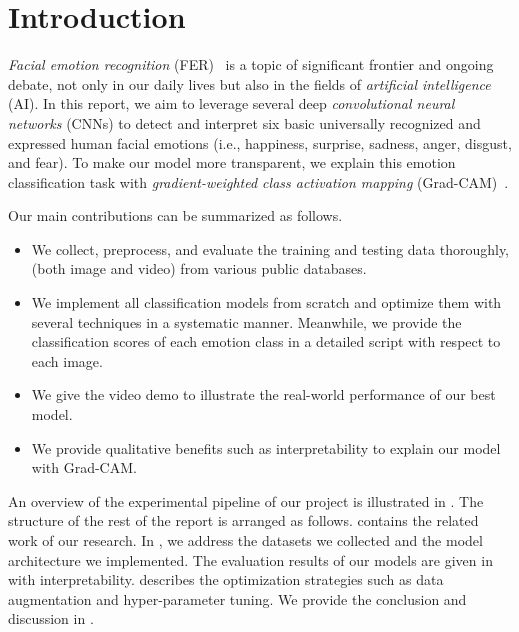 \section{Introduction}
\label{sec:intro}

\textit{Facial emotion recognition} (FER)~\cite{Ko18,JainSS19,YinTLS019,Malik0R21} is a topic of significant frontier and ongoing debate, 
not only in our daily lives but also in the fields of \textit{artificial intelligence} (AI).
In this report, we aim to leverage several deep 
\textit{convolutional neural networks} (CNNs) to detect and interpret six basic universally recognized and expressed human facial emotions 
(i.e., happiness, surprise, sadness, anger, disgust, and fear). 
To make our model more transparent, 
we explain this emotion classification task with \textit{gradient-weighted class activation mapping} 
(Grad-CAM)~\cite{SelvarajuCDVPB17}. 

Our main contributions can be summarized as follows.
\begin{itemize}
  \item We collect, preprocess, and evaluate the training and testing data thoroughly, 
  (both image and video) from various public databases. 
  \item We implement all classification models from scratch and optimize them with several techniques in a systematic manner. 
  Meanwhile, we provide the classification scores of each emotion class in a detailed script with respect to each image. 
  \item We give the video demo to illustrate the real-world performance of our best model.
  \item We provide qualitative benefits such as interpretability to explain our model with Grad-CAM. 
\end{itemize}

An overview of the experimental pipeline of our project is illustrated in . 
The structure of the rest of the report is arranged as follows. 
 contains the related work of our research. 
In , 
we address the datasets we collected and the model architecture we implemented. 
The evaluation results of our models are given in  with interpretability. 
 describes the optimization strategies such as data augmentation and hyper-parameter tuning. 
We provide the conclusion and discussion in . 

